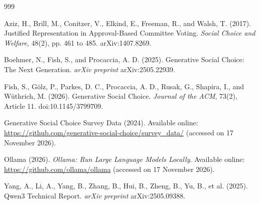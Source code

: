 \documentclass[letterpaper,11pt]{article}
\theoremstyle{plain}
\theoremstyle{definition}
\begin{document}
\begin{thebibliography}{999}

Aziz, H., Brill, M., Conitzer, V., Elkind, E., Freeman, R., and Walsh, T. (2017). Justified Representation in Approval-Based Committee Voting. \emph{Social Choice and Welfare}, 48(2), pp. 461 to 485. arXiv:1407.8269.

Boehmer, N., Fish, S., and Procaccia, A. D. (2025). Generative Social Choice: The Next Generation. \emph{arXiv preprint} arXiv:2505.22939.

Fish, S., G\"olz, P., Parkes, D. C., Procaccia, A. D., Rusak, G., Shapira, I., and W\"uthrich, M. (2026). Generative Social Choice. \emph{Journal of the ACM}, 73(2), Article 11. doi:10.1145/3799709.

Generative Social Choice Survey Data (2024). Available online: \url{https://github.com/generative-social-choice/survey_data/} (accessed on 17 November 2026).

Ollama (2026). \emph{Ollama: Run Large Language Models Locally}. Available online: \url{https://github.com/ollama/ollama} (accessed on 17 November 2026).

Yang, A., Li, A., Yang, B., Zhang, B., Hui, B., Zheng, B., Yu, B., et al. (2025). Qwen3 Technical Report. \emph{arXiv preprint} arXiv:2505.09388.

\end{thebibliography}

\appendix 


\end{document}
